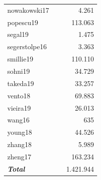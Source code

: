 \begin{table}[ht!]
\begin{tabular}{l|c|r}
nowakowski17 & ~\citep{nowakowski_spatiotemporal_2017} & 4.261  \\

popescu19 & ~\citep{popescu_decoding_2019} & 113.063  \\

segal19 & ~\citep{segal_single_2019} & 1.475  \\

segerstolpe16 & ~\citep{segerstolpe_single-cell_2016} & 3.363  \\

smillie19 & ~\citep{smillie_intra-_2019} & 110.110  \\

sohni19 & ~\citep{sohni_neonatal_2019} & 34.729  \\

takeda19 & ~\citep{takeda_single-cell_2019} & 33.257  \\

vento18 & ~\citep{vento-tormo_single-cell_2018} & 69.883  \\

vieira19 & ~\citep{braga_cellular_2019} & 26.013  \\

wang16 & ~\citep{wang_single-cell_2016} & 635  \\

young18 & ~\citep{young_single-cell_2018} & 44.526  \\

zhang18 & ~\citep{zhang_lineage_2018} & 5.989  \\

zheng17 & ~\citep{zheng_massively_2017} & 163.234  \\
\midrule
\textbf{\textit{Total}} &  & 1.421.944  \\

\bottomrule
\end{tabular}
\end{table}


